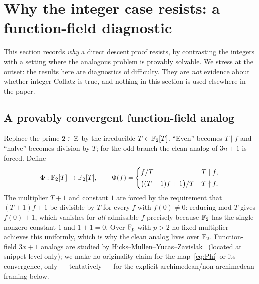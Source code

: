 \documentclass[11pt]{amsart}
\theoremstyle{definition}
\theoremstyle{remark}
\begin{document}
\section{Why the integer case resists: a function-field diagnostic}
\label{sec:why-hard}

This section records \emph{why} a direct descent proof resists, by contrasting the integers with a
setting where the analogous problem is provably solvable. We stress at the outset: the results here
are diagnostics of difficulty. They are \emph{not} evidence about whether integer Collatz is true,
and nothing in this section is used elsewhere in the paper.

\subsection{A provably convergent function-field analog}
Replace the prime $2\in\mathbb{Z}$ by the irreducible $T\in\mathbb{F}_2[T]$. ``Even'' becomes $T\mid f$ and
``halve'' becomes division by $T$; for the odd branch the clean analog of $3n+1$ is forced. Define
\begin{equation}
   \Phi:\mathbb{F}_2[T]\to\mathbb{F}_2[T],\qquad
   \Phi(f)=\begin{cases} f/T & T\mid f,\\[2pt] \big((T+1)f+1\big)/T & T\nmid f.\end{cases}
   \label{eq:Phi}
\end{equation}
The multiplier $T+1$ and constant $1$ are forced by the requirement that $(T+1)f+1$ be divisible by
$T$ for every $f$ with $f(0)\ne0$: reducing mod $T$ gives $f(0)+1$, which vanishes for \emph{all}
admissible $f$ precisely because $\mathbb{F}_2$ has the single nonzero constant $1$ and $1+1=0$. Over $\mathbb{F}_p$
with $p>2$ no fixed multiplier achieves this uniformly, which is why the clean analog lives over
$\mathbb{F}_2$. %
Function-field $3x+1$ analogs are studied by Hicks--Mullen--Yucas--Zavislak~\citep{hicksmullenyucas2008}
(located at snippet level only); we make no originality claim for the map~\eqref{eq:Phi} or its
convergence, only --- tentatively --- for the explicit archimedean/non-archimedean framing below.
\end{document}
